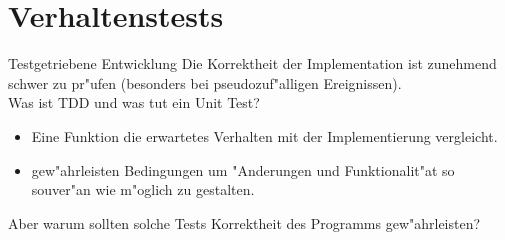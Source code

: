 \documentclass{beamer}
\begin{document}

\section{Verhaltenstests}
\begin{frame}{Testgetriebene Entwicklung}
Die Korrektheit der Implementation ist zunehmend schwer zu pr"ufen (besonders bei pseudozuf"alligen Ereignissen).\\\pause
Was ist TDD und was tut ein Unit Test?
\begin{itemize}
	\item Eine Funktion die erwartetes Verhalten mit der Implementierung vergleicht.
	\item gew"ahrleisten Bedingungen um "Anderungen und Funktionalit"at so souver"an wie m"oglich zu gestalten.
\end{itemize}\pause
Aber warum sollten solche Tests Korrektheit des Programms gew"ahrleisten?
\end{frame}
\end{document}

